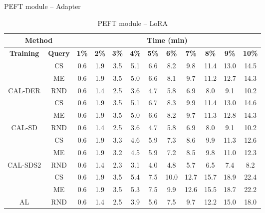 \begin{table}[htbp]
\centering
\begin{subtable}{\linewidth}
\centering
\caption{PEFT module -- Adapter}

\begin{tabular}{c|c|cccccccccc}
\toprule
\multicolumn{2}{c|}{\textbf{Method}} & \multicolumn{10}{c}{\textbf{Time (min)}} \\
\midrule
\textbf{Training} & \textbf{Query} & \textbf{1\%} & \textbf{2\%} & \textbf{3\%} & \textbf{4\%} & \textbf{5\%} & \textbf{6\%} & \textbf{7\%} & \textbf{8\%} & \textbf{9\%} & \textbf{10\%}\\
\midrule
 & CS & 0.6 & 1.9 & 3.5 & 5.1 & 6.6 & 8.2 & 9.8 & 11.4 & 13.0 & 14.5\\

 & ME & 0.6 & 1.9 & 3.5 & 5.0 & 6.6 & 8.1 & 9.7 & 11.2 & 12.7 & 14.3\\

\multirow{-3}{*}{\raggedright\arraybackslash CAL-DER} & RND & 0.6 & 1.4 & 2.5 & 3.6 & 4.7 & 5.8 & 6.9 & 8.0 & 9.1 & 10.2\\
\midrule
 & CS & 0.6 & 1.9 & 3.5 & 5.1 & 6.7 & 8.3 & 9.9 & 11.4 & 13.0 & 14.6\\

 & ME & 0.6 & 1.9 & 3.5 & 5.0 & 6.6 & 8.2 & 9.7 & 11.3 & 12.8 & 14.3\\

\multirow{-3}{*}{\raggedright\arraybackslash CAL-SD} & RND & 0.6 & 1.4 & 2.5 & 3.6 & 4.7 & 5.8 & 6.9 & 8.0 & 9.1 & 10.2\\
\midrule
 & CS & 0.6 & 1.9 & 3.3 & 4.6 & 5.9 & 7.3 & 8.6 & 9.9 & 11.3 & 12.6\\

 & ME & 0.6 & 1.9 & 3.2 & 4.5 & 5.9 & 7.2 & 8.5 & 9.8 & 11.0 & 12.3\\

\multirow{-3}{*}{\raggedright\arraybackslash CAL-SDS2} & RND & 0.6 & 1.4 & 2.3 & 3.1 & 4.0 & 4.8 & 5.7 & 6.5 & 7.4 & 8.2\\
\midrule
 & CS & 0.6 & 1.9 & 3.5 & 5.4 & 7.5 & 10.0 & 12.7 & 15.7 & 18.9 & 22.4\\

 & ME & 0.6 & 1.9 & 3.5 & 5.3 & 7.5 & 9.9 & 12.6 & 15.5 & 18.7 & 22.2\\

\multirow{-3}{*}{\raggedright\arraybackslash AL} & RND & 0.6 & 1.4 & 2.5 & 3.9 & 5.6 & 7.5 & 9.7 & 12.2 & 15.0 & 18.0\\
\bottomrule
\end{tabular}
\end{subtable}
\vspace{1em}
\begin{subtable}{\linewidth}
\centering
\caption{PEFT module -- LoRA}


\end{subtable}
\end{table}
